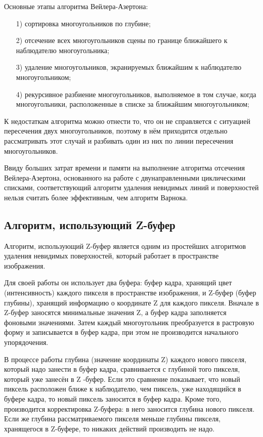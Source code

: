 Основные этапы алгоритма Вейлера-Азертона:
\begin{enumerate}
	\item[1)] сортировка многоугольников по глубине;
	\item[2)] отсечение всех многоугольников сцены по границе ближайшего к наблюдателю многоугольника;
	\item[3)] удаление многоугольников, экранируемых ближайшим к наблюдателю многоугольником;
	\item[4)] рекурсивное разбиение многоугольников, выполняемое в том случае, когда многоугольники, расположенные в списке за ближайшим многоугольником;
\end{enumerate}

К недостаткам алгоритма можно отнести то, что он не справляется с ситуацией пересечения двух многоугольников, поэтому в нём приходится отдельно рассматривать этот случай и разбивать один из них по линии пересечения многоугольников.

Ввиду больших затрат времени и памяти на выполнение алгоритма отсечения Вейлера-Азертона, основанного на работе с двунаправленными циклическими списками, соответствующий алгоритм удаления невидимых линий и поверхностей нельзя считать более эффективным, чем алгоритм Варнока.

\subsection{Алгоритм, использующий Z-буфер}
Алгоритм, использующий Z-буфер является одним из простейших алгоритмов удаления невидимых поверхностей, который работает в пространстве изображения.

Для своей работы он использует два буфера: буфер кадра, хранящий цвет (интенсивность) каждого пикселя в пространстве изображения, и Z-буфер (буфер глубины), хранящий информацию о координате Z для каждого пикселя. Вначале в Z-буфер заносятся минимальные значения Z, а буфер кадра заполняется фоновыми значениями. Затем каждый многоугольник преобразуется в растровую форму и записывается в буфер кадра, при этом не производится начального упорядочения.

В процессе работы глубина (значение координаты Z) каждого нового пикселя, который надо занести в буфер кадра, сравнивается с глубиной того пикселя, который уже занесён в Z -буфер. Если это сравнение показывает, что новый пиксель расположен ближе к наблюдателю, чем пиксель, уже находящийся в буфере кадра, то новый пиксель заносится в буфер кадра. Кроме того, производится корректировка Z-буфера: в него заносится глубина нового пикселя. Если же глубина рассматриваемого пикселя меньше глубины пикселя, хранящегося в Z-буфере, то никаких действий производить не надо.

